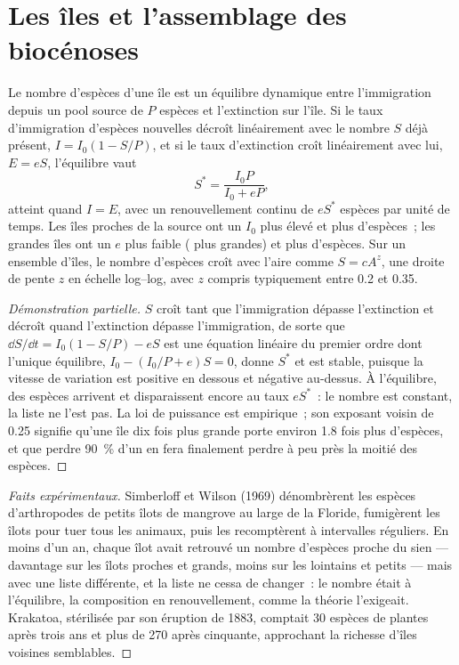 \section{Les îles et l'assemblage des biocénoses}

\begin{theorem}\label{thm:b1:ecosystem-dynamics:island}
Le nombre d'espèces d'une île est un équilibre dynamique entre
l'immigration depuis un pool source de $P$ espèces et l'extinction sur
l'île. Si le taux d'immigration d'espèces nouvelles décroît linéairement
avec le nombre $S$ déjà présent, $I = I_0(1 - S/P)$, et si le taux
d'extinction croît linéairement avec lui, $E = eS$, l'équilibre vaut
\[
S^* = \frac{I_0 P}{I_0 + eP} ,
\]
atteint quand $I = E$, avec un renouvellement continu de $eS^*$ espèces
par unité de temps. Les îles proches de la source ont un $I_0$ plus
élevé et plus d'espèces~; les grandes îles ont un $e$ plus faible
( plus grandes) et plus d'espèces. Sur un ensemble d'îles, le
nombre d'espèces croît avec l'aire comme
$S = cA^z$, une droite de pente $z$ en échelle log--log, avec
$z$ compris typiquement entre \num{0.2} et \num{0.35}.
\end{theorem}
\begin{proof}[Démonstration partielle]
$S$ croît tant que l'immigration dépasse l'extinction et décroît quand
l'extinction dépasse l'immigration, de sorte que
$\dd S/\dd t = I_0(1 - S/P) - eS$
est une équation linéaire du premier ordre dont l'unique équilibre, $I_0 -
(I_0/P + e)S = 0$, donne $S^*$ et est stable, puisque la vitesse de
variation est positive en dessous et négative au-dessus. À l'équilibre,
des espèces arrivent et disparaissent encore au taux $eS^*$~: le nombre
est constant, la liste ne l'est pas. La loi de puissance est empirique~;
son exposant voisin de
\num{0.25} signifie qu'une île dix fois plus grande porte environ
\num{1.8} fois plus d'espèces, et que perdre \qty{90}{\%} d'un 
en fera finalement perdre à peu près la moitié des espèces.
\end{proof}
\begin{proof}[Faits expérimentaux]
Simberloff et Wilson (1969) dénombrèrent les espèces d'arthropodes de
petits îlots de mangrove au large de la Floride, fumigèrent les îlots
pour tuer tous les animaux, puis les recomptèrent à intervalles
réguliers. En moins d'un an, chaque îlot avait retrouvé un nombre
d'espèces proche du sien --- davantage sur les îlots proches et grands,
moins sur les lointains et petits --- mais avec une liste différente, et
la liste ne cessa de changer~: le nombre était à l'équilibre, la
composition en renouvellement, comme la théorie l'exigeait. Krakatoa,
stérilisée par son éruption de 1883, comptait \num{30} espèces de
plantes après trois ans et plus de \num{270} après cinquante,
approchant la richesse d'îles voisines semblables.
\end{proof}

